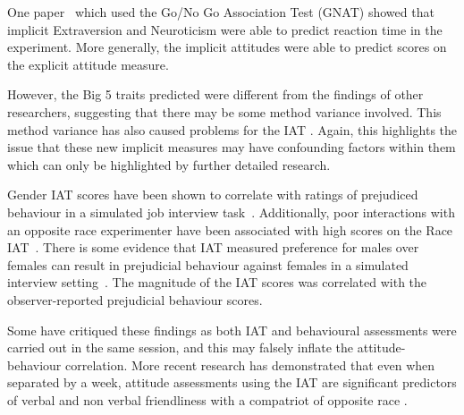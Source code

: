 

One paper~\cite{Boldero2007} which used the Go/No Go Association Test (GNAT) showed that implicit Extraversion and Neuroticism were able to predict reaction time in the experiment. More generally, the implicit attitudes were able to predict scores on the explicit attitude measure. 

However, the Big 5 traits predicted were different from the findings of other researchers, suggesting that there may be some method variance involved. This method variance has also caused problems for the IAT \cite{Mierke2003,Greenwald2003a}. Again, this highlights the issue that these new implicit measures may have confounding factors within them which can only be highlighted by further detailed research.



Gender IAT scores have been shown to correlate with ratings of prejudiced behaviour in a simulated job interview task~\cite{Rudman1999a}. Additionally, poor interactions with an opposite race experimenter have been associated with high scores on the Race IAT~\cite{McConnell2001}. 
There is some evidence that IAT measured preference for males over females  can result in prejudicial behaviour against females in a simulated interview setting~\cite{Greenwald2000,Heider2007}. The magnitude of the IAT scores was correlated with the observer-reported prejudicial behaviour scores. 

Some have critiqued these findings as both IAT and behavioural assessments were carried out in the same session, and this may falsely inflate the attitude-behaviour correlation. %
More recent research has demonstrated that even when separated by a week, attitude assessments using the IAT are significant predictors of verbal and non verbal friendliness with a compatriot of opposite race \cite{Heider2007}. 

